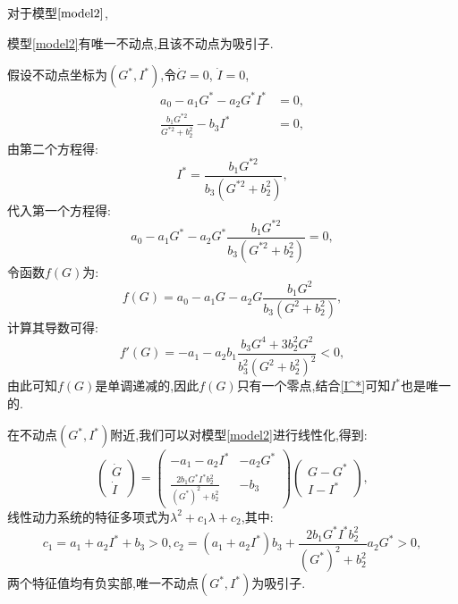 对于模型$\ref{model2}$,
\begin{prop}
    模型\ref{model2}有唯一不动点,且该不动点为吸引子. 
\end{prop}
\begin{pf}
    假设不动点坐标为$(G^*,I^*)$,令$\dot{G} = 0$, $\dot{I} = 0$,
    \begin{equation}
        \begin{aligned}
            a_0-a_1G^*-a_2G^*I^* & = 0,  \\
            \frac{b_1 G^{*2}}{G^{*2} + b_2^2} - b_3 I^* & = 0,
        \end{aligned}
    \end{equation}
    由第二个方程得:
    \begin{equation}\label{I^*}
        I^*= \frac{b_1 G^{*2}}{b_3(G^{*2} + b_2^2)},
    \end{equation}
    代入第一个方程得:
    \begin{equation}
        a_0-a_1G^*-a_2G^*\frac{b_1 G^{*2}}{b_3(G^{*2} + b_2^2)} = 0,
    \end{equation}
    令函数$f(G)$为:
    \begin{equation}
        f(G) = a_0-a_1G-a_2G\frac{b_1 G^2}{b_3(G^2 + b_2^2)},
    \end{equation}
    计算其导数可得:
    \begin{equation}
        f'(G) = -a_1 - a_2b_1\frac{b_3G^4+3b_2^2G^2}{b_3^2(G^2+b_2^2)^2}<0,
    \end{equation}
    由此可知$f(G)$是单调递减的,因此$f(G)$只有一个零点,结合\ref{I^*}可知$I^*$也是唯一的. 

    在不动点$(G^*,I^*)$附近,我们可以对模型\ref{model2}进行线性化,得到:
    \begin{equation}
        \begin{pmatrix}
            \dot{G}  \\
            \dot{I}
        \end{pmatrix}=
        \begin{pmatrix}
            -a_1-a_2I^* & -a_2G^*  \\
            \frac{2b_1G^*I^*b_2^2}{(G^*)^2+b_2^2} & -b_3
        \end{pmatrix}
        \begin{pmatrix}
            G-G^*  \\
            I-I^*
        \end{pmatrix},
    \end{equation}
    线性动力系统的特征多项式为$\lambda^2+c_1\lambda+c_2$,其中:
    \begin{equation}
        c_1=a_1+a_2I^*+b_3>0, c_2=(a_1+a_2I^*)b_3+\frac{2b_1G^*I^*b_2^2}{(G^*)^2+b_2^2}a_2G^*>0,
    \end{equation}
    两个特征值均有负实部,唯一不动点$(G^*,I^*)$为吸引子. 
\end{pf}
